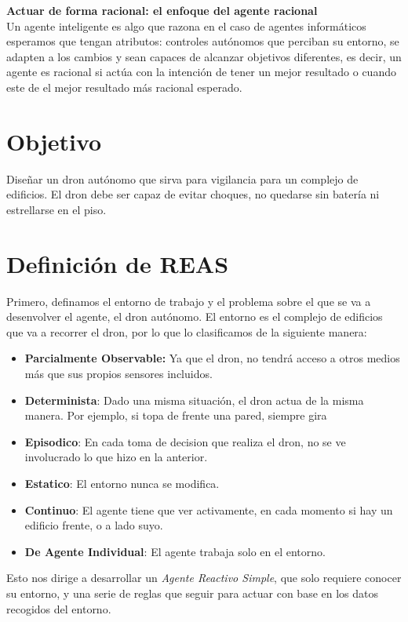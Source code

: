 \documentclass[12pt]{article}
\begin{document}
\textbf{Actuar de forma racional: el enfoque del agente racional}\\

Un agente inteligente es algo que razona en el caso de agentes informáticos esperamos que
tengan atributos: controles autónomos que perciban su entorno, se adapten a los cambios y
sean capaces de alcanzar objetivos diferentes, es decir, un agente es racional si actúa con la
intención de tener un mejor resultado o cuando este de el mejor resultado más racional
esperado.

\section{Objetivo}
Diseñar un dron autónomo que sirva para vigilancia para un complejo de edificios. El dron debe ser capaz de evitar choques, no quedarse sin batería ni estrellarse en el piso.

\section{Definición de REAS}
Primero, definamos el entorno de trabajo y el problema sobre el que se va a desenvolver el agente, el dron autónomo. El entorno es el complejo de edificios que va a recorrer el dron, por lo que lo clasificamos de la siguiente manera:

\begin{itemize}
    \item \textbf{Parcialmente Observable:} Ya que el dron, no tendrá acceso a otros medios más que sus propios sensores incluidos.
    \item \textbf{Determinista}: Dado una misma situación, el dron actua de la misma manera. Por ejemplo, si topa de frente una pared, siempre gira 
    \item \textbf{Episodico}: En cada toma de decision que realiza el dron, no se ve involucrado lo que hizo en la anterior.
    \item \textbf{Estatico}: El entorno nunca se modifica.
    \item \textbf{Continuo}: El agente tiene que ver activamente, en cada momento si hay un edificio frente, o a lado suyo.
    \item \textbf{De Agente Individual}: El agente trabaja solo en el entorno.
\end{itemize}

Esto nos dirige a desarrollar un \emph{Agente Reactivo Simple}, que solo requiere conocer su entorno, y una serie de reglas que seguir para actuar con base en los datos recogidos del entorno.
\end{document}
